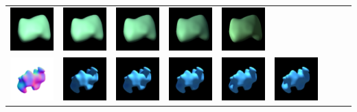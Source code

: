 \begin{center}
\begin{longtable}{@{}c@{}c@{}c@{}c@{}c@{}c@{}c@{}c@{}c@{}}
\includegraphics[width=0.1\linewidth]{training/40_3.png} & \includegraphics[width=0.1\linewidth]{training/40_4.png} &
\includegraphics[width=0.1\linewidth]{training/40_5.png} & \includegraphics[width=0.1\linewidth]{training/40_6.png} &
\includegraphics[width=0.1\linewidth]{training/40_7.png} \\
\includegraphics[width=0.1\linewidth]{training/41_gt.png} & \includegraphics[width=0.1\linewidth]{training/41_0.png} &
\includegraphics[width=0.1\linewidth]{training/41_1.png} & \includegraphics[width=0.1\linewidth]{training/41_2.png} &
\includegraphics[width=0.1\linewidth]{training/41_3.png} & \includegraphics[width=0.1\linewidth]{training/41_4.png} &

\end{longtable}
\end{center}
